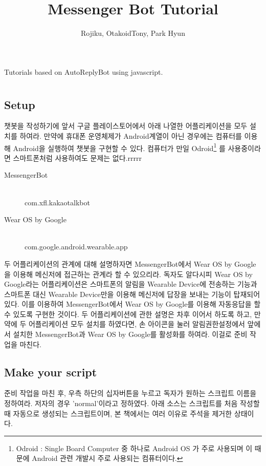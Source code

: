 \documentclass[10pt,b6paper,final]{book}
\author{Rojiku, OtakoidTony, Park Hyun}
\title{Messenger Bot Tutorial}
\begin{document}
\maketitle
Tutorials based on AutoReplyBot using javascript.\\



\chapter{}
\section{Setup}
챗봇을 작성하기에 앞서 구글 플레이스토어에서 아래 나열한 어플리케이션을 모두 설치를 하여라.
만약에 휴대폰 운영체제가 Android계열이 아닌 경우에는 컴퓨터를 이용해 Android을 실행하여 
챗봇을 구현할 수 있다. 컴퓨터가 만일 Odroid\footnote{Odroid : Single Board Computer 중 하나로 Android OS 가 주로 사용되며 이 때문에 Android 관련 개발시 주로 사용되는 컴퓨터이다.} 를 사용중이라면 스마트폰처럼 사용하여도 문제는
없다.rrrrr

\begin{description}
\item[MessengerBot]\hfill\\
com.xfl.kakaotalkbot
\item[Wear OS by Google]\hfill\\
com.google.android.wearable.app
\end{description}
두 어플리케이션의 관계에 대해 설명하자면 MessengerBot에서 
Wear OS by Google을 이용해 메신저에 접근하는 관계라 할 수 있으리라.
독자도 알다시피 Wear OS by Google라는 어플리케이션은 스마트폰의 알림을
Wearable Device에 전송하는 기능과 스마트폰 대신 Wearable Device만을
이용해 메신저에 답장을 보내는 기능이 탑재되어 있다.
이를 이용하여 MessengerBot에서 Wear OS by Google를 이용해 자동응답을
할 수 있도록 구현한 것이다. 두 어플리케이션에 관한 설명은 차후 이어서 하도록 하고,
만약에 두 어플리케이션 모두 설치를 하였다면, 손 아이콘을 눌러 알림권한설정에서 앞에서 설치한
MessengerBot과 Wear OS by Google를 활성화를 하여라. 이걸로 준비 작업을 마친다.

\section{Make your script}
준비 작업을 마친 후, 우측 하단의 십자버튼을 누르고 독자가 원하는 스크립트 이름을 정하여라.
저자의 경우 'normal'이라고 정하였다.
아래 소스는 스크립트를 처음 작성할 때 자동으로 생성되는 스크립트이며,
본 책에서는 여러 이유로 주석을 제거한 상태이다.
\end{document}

